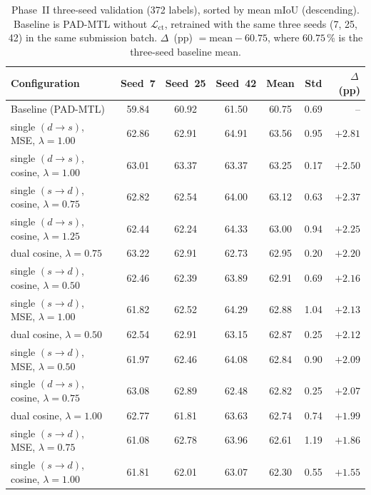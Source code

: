 \begin{table}[H]
\centering
\caption{Phase~II three-seed validation (372 labels), sorted by mean
mIoU (descending). Baseline is PAD-MTL without $\mathcal{L}_\text{ct}$,
retrained with the same three seeds (7, 25, 42) in the same submission
batch. $\Delta$~(pp) $= \text{mean} - 60.75$, where $60.75$\,\% is the
three-seed baseline mean.}
\label{tab:ct-phase2-3seeds}
\renewcommand{\arraystretch}{1.3}
\small
\begin{tabularx}{\textwidth}{Xcccccr}
\toprule
Configuration &
Seed~7 & Seed~25 & Seed~42 & Mean & Std & $\Delta$\,(pp) \\
\midrule
Baseline (PAD-MTL) &
59.84 & 60.92 & 61.50 & 60.75 & 0.69 & -- \\
\midrule
single $(d{\rightarrow}s)$, MSE, $\lambda=1.00$ &
62.86 & 62.91 & 64.91 & 63.56 & 0.95 & $+2.81$ \\
single $(d{\rightarrow}s)$, cosine, $\lambda=1.00$ &
63.01 & 63.37 & 63.37 & 63.25 & 0.17 & $+2.50$ \\
single $(s{\rightarrow}d)$, cosine, $\lambda=0.75$ &
62.82 & 62.54 & 64.00 & 63.12 & 0.63 & $+2.37$ \\
single $(d{\rightarrow}s)$, cosine, $\lambda=1.25$ &
62.44 & 62.24 & 64.33 & 63.00 & 0.94 & $+2.25$ \\
dual cosine, $\lambda=0.75$ &
63.22 & 62.91 & 62.73 & 62.95 & 0.20 & $+2.20$ \\
single $(s{\rightarrow}d)$, cosine, $\lambda=0.50$ &
62.46 & 62.39 & 63.89 & 62.91 & 0.69 & $+2.16$ \\
single $(s{\rightarrow}d)$, MSE, $\lambda=1.00$ &
61.82 & 62.52 & 64.29 & 62.88 & 1.04 & $+2.13$ \\
dual cosine, $\lambda=0.50$ &
62.54 & 62.91 & 63.15 & 62.87 & 0.25 & $+2.12$ \\
single $(s{\rightarrow}d)$, MSE, $\lambda=0.50$ &
61.97 & 62.46 & 64.08 & 62.84 & 0.90 & $+2.09$ \\
single $(d{\rightarrow}s)$, cosine, $\lambda=0.75$ &
63.08 & 62.89 & 62.48 & 62.82 & 0.25 & $+2.07$ \\
dual cosine, $\lambda=1.00$ &
62.77 & 61.81 & 63.63 & 62.74 & 0.74 & $+1.99$ \\
single $(s{\rightarrow}d)$, MSE, $\lambda=0.75$ &
61.08 & 62.78 & 63.96 & 62.61 & 1.19 & $+1.86$ \\
single $(s{\rightarrow}d)$, cosine, $\lambda=1.00$ &
61.81 & 62.01 & 63.07 & 62.30 & 0.55 & $+1.55$ \\
\bottomrule
\end{tabularx}
\end{table}

